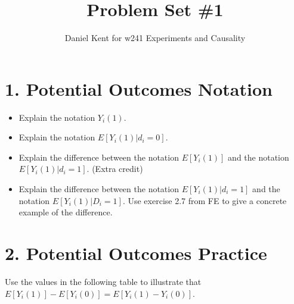 \documentclass[]{article}
\title{Problem Set \#1}
\author{Daniel Kent for w241 Experiments and Causality}
\date{\begin{verbatim}
oday
\end{verbatim}}
\begin{document}
\maketitle

\section{1. Potential Outcomes
Notation}\label{potential-outcomes-notation}

\begin{itemize}
\item
  Explain the notation \(Y_{i}(1)\).
\item
  Explain the notation \(E[Y_{i}(1)|d_{i}=0]\).
\item
  Explain the difference between the notation \(E[Y_{i}(1)]\) and the
  notation \(E[Y_{i}(1)|d_{i}=1]\). (Extra credit)
\item
  Explain the difference between the notation \(E[Y_{i}(1)|d_{i}=1]\)
  and the notation \(E[Y_{i}(1)|D_{i}=1]\). Use exercise 2.7 from FE to
  give a concrete example of the difference.
\end{itemize}

\section{2. Potential Outcomes
Practice}\label{potential-outcomes-practice}

Use the values in the following table to illustrate that
\(E[Y_{i}(1)] - E[Y_{i}(0)] = E[Y_{i}(1) - Y_{i}(0)]\).
\end{document}
